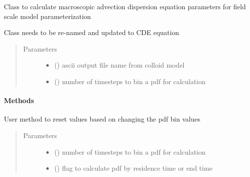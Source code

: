 \documentclass[letterpaper,10pt,english]{sphinxmanual}
\begin{document}
\begin{fulllineitems}
\label{\detokenize{index:lb_colloids.Colloids.Colloid_output.ADE}}
Class to calculate macroscopic advection dispersion
equation parameters for field scale model parameterization

Class needs to be re-named and updated to CDE equation
\begin{quote}\begin{description}
\item[{Parameters}] \leavevmode\begin{itemize}
\item {} 
 () \textendash{} ascii output file name from colloid model

\item {} 
 () \textendash{} number of timesteps to bin a pdf for calculation

\end{itemize}

\end{description}\end{quote}
\paragraph{Methods}

\begin{fulllineitems}
\label{\detokenize{index:lb_colloids.Colloids.Colloid_output.ADE.reset_pdf}}
User method to reset values based on changing
the pdf bin values
\begin{quote}\begin{description}
\item[{Parameters}] \leavevmode\begin{itemize}
\item {} 
 () \textendash{} number of timesteps to bin a pdf for calculation

\item {} 
 () \textendash{} flag to calculate pdf by residence time or end time


\end{itemize}
\end{description}
\end{quote}
\end{fulllineitems}
\end{fulllineitems}
\end{document}
